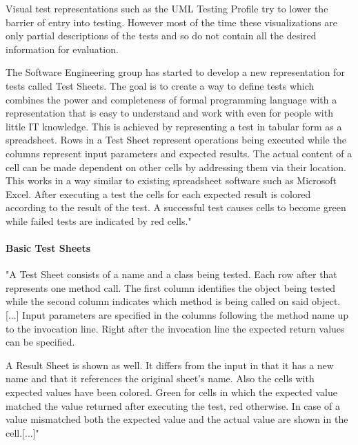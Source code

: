 \documentclass{llncs}
\begin{document}
Visual test representations such as the UML Testing Profile try to lower the barrier of entry into testing.
However most of the time these visualizations are only partial descriptions of the tests and so do not contain all the desired information for evaluation.

The Software Engineering group has started to develop a new representation for tests called Test Sheets.
The goal is to create a way to define tests which combines the power and completeness of formal programming language with a representation that is easy to understand and work with even for people with little IT knowledge.
This is achieved by representing a test in tabular form as a spreadsheet.
Rows in a Test Sheet represent operations being executed while the columns represent input parameters and expected results.
The actual content of a cell can be made dependent on other cells by addressing them via their location.
This works in a way similar to existing spreadsheet software such as Microsoft Excel.
After executing a test the cells for each expected result is colored according to the result of the test.
A successful test causes cells to become green while failed tests are indicated by red cells."\cite{ts}
 \paragraph{Basic Test Sheets}
"A Test Sheet consists of a name and a class being tested. 
Each row after that represents one method call.
The first column identifies the object being tested while the second column indicates which method is being called on said object. [...]
Input parameters are specified in the columns following the method name up to the invocation line. 
Right after the invocation line the expected return values can be specified.

A Result Sheet is shown as well. 
It differs from the input in that it has a new name and that it references the original sheet's name. 
Also the cells with expected values have been colored. 
Green for cells in which the expected value matched the value returned after executing the test, red otherwise. 
In case of a value mismatched both the expected value and the actual value are shown in the cell.[...]"\cite{tsb}

\end{document}
